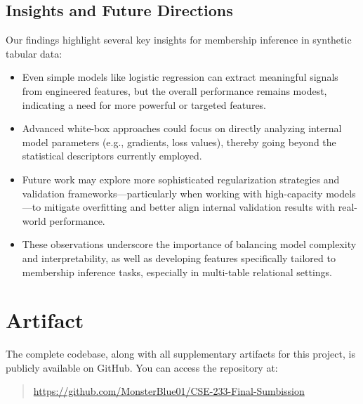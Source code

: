 \documentclass[12pt]{article}
\begin{document}
\subsection*{Insights and Future Directions}
Our findings highlight several key insights for membership inference in synthetic tabular data:
\begin{itemize}
    \item Even simple models like logistic regression can extract meaningful signals from engineered features, but the overall performance remains modest, indicating a need for more powerful or targeted features.
    \item Advanced white-box approaches could focus on directly analyzing internal model parameters (e.g., gradients, loss values), thereby going beyond the statistical descriptors currently employed.
    \item Future work may explore more sophisticated regularization strategies and validation frameworks—particularly when working with high-capacity models—to mitigate overfitting and better align internal validation results with real-world performance.
    \item These observations underscore the importance of balancing model complexity and interpretability, as well as developing features specifically tailored to membership inference tasks, especially in multi-table relational settings.
\end{itemize}

\section{Artifact}
\label{sec:artifact}
The complete codebase, along with all supplementary artifacts for this project, is publicly available on GitHub. You can access the repository at:

\begin{quote}
\url{https://github.com/MonsterBlue01/CSE-233-Final-Sumbission}
\end{quote}
\end{document}
